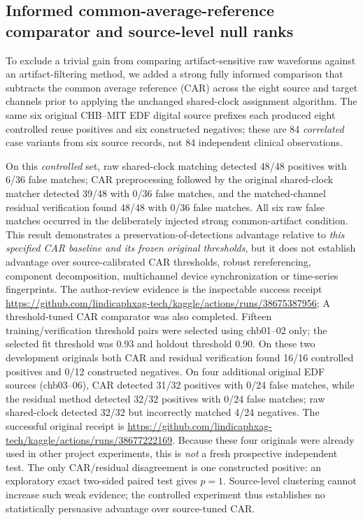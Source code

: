 \subsection{Informed common-average-reference comparator and source-level null ranks}
To exclude a trivial gain from comparing artifact-sensitive raw waveforms
against an artifact-filtering method, we added a strong fully informed
comparison that subtracts the common average reference (CAR) across
the eight source and target channels prior to applying the unchanged
shared-clock assignment algorithm. The same six original CHB--MIT
EDF digital source prefixes each produced eight controlled reuse
positives and six constructed negatives; these are 84 \emph{correlated}
case variants from six source records, not 84 independent clinical
observations.

On this \emph{controlled} set, raw shared-clock matching detected
48/48 positives with 6/36 false matches; CAR preprocessing followed
by the original shared-clock matcher detected 39/48 with 0/36 false
matches, and the matched-channel residual verification found 48/48
with 0/36 false matches. All six raw false matches occurred in
the deliberately injected strong common-artifact condition.
This result demonstrates a preservation-of-detections advantage
relative to \emph{this specified CAR baseline and its frozen original
thresholds}, but it does not establish advantage over source-calibrated
CAR thresholds, robust rereferencing, component decomposition,
multichannel device synchronization or time-series fingerprints.
The author-review evidence is the inspectable success receipt
\url{https://github.com/lindicaphxag-tech/kaggle/actions/runs/38675387956};
A threshold-tuned CAR comparator was also completed. Fifteen
training/verification threshold pairs were selected using chb01--02
only; the selected fit threshold was 0.93 and holdout threshold 0.90.
On these two development originals both CAR and residual verification
found 16/16 controlled positives and 0/12 constructed negatives.
On four additional original EDF sources (chb03--06), CAR detected
31/32 positives with 0/24 false matches, while the residual method
detected 32/32 positives with 0/24 false matches; raw shared-clock
detected 32/32 but incorrectly matched 4/24 negatives.
The successful original receipt is
\url{https://github.com/lindicaphxag-tech/kaggle/actions/runs/38677222169}.
Because these four originals were already used in other project
experiments, this is \emph{not} a fresh prospective independent test.
The only CAR/residual disagreement is one constructed positive:
an exploratory exact two-sided paired test gives $p=1$.
Source-level clustering cannot increase such weak evidence;
the controlled experiment thus establishes no statistically
persuasive advantage over source-tuned CAR.

